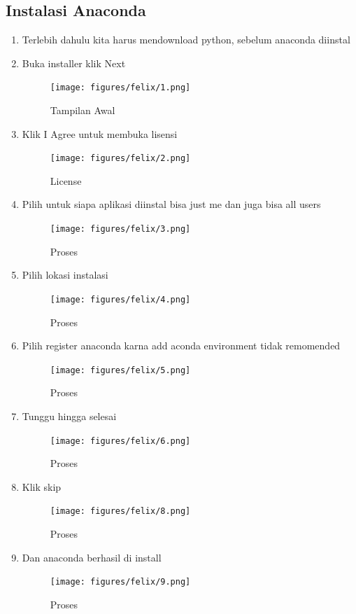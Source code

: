 \subsection{Instalasi Anaconda}
\begin{enumerate}
    \item Terlebih dahulu kita harus mendownload python, sebelum anaconda diinstal
    \item Buka installer klik Next
     \begin{figure}[!htbp]
        \centering
        \texttt{[image: figures/felix/1.png]}
        \caption{Tampilan Awal}
        \label{awal}
        \end{figure}
    \item Klik I Agree untuk membuka lisensi
     \begin{figure}[!htbp]
        \centering
        \texttt{[image: figures/felix/2.png]}
        \caption{License}
        \label{awal}
        \end{figure}
    \item  Pilih untuk siapa aplikasi diinstal bisa just me dan juga bisa all users
     \begin{figure}[!htbp]
        \centering
        \texttt{[image: figures/felix/3.png]}
        \caption{Proses}
        \label{awal}
        \end{figure}
    \item  Pilih lokasi instalasi
    \begin{figure}[!htbp]
        \centering
        \texttt{[image: figures/felix/4.png]}
        \caption{Proses}
        \label{awal}
        \end{figure}
    \item Pilih register anaconda karna add aconda environment tidak remomended
    \begin{figure}[!htbp]
        \centering
        \texttt{[image: figures/felix/5.png]}
        \caption{Proses}
        \label{awal}
        \end{figure}
    \item Tunggu hingga selesai
    \begin{figure}[!htbp]
        \centering
        \texttt{[image: figures/felix/6.png]}
        \caption{Proses}
        \label{awal}
        \end{figure}
    \item Klik skip
    \begin{figure}[!htbp]
        \centering
        \texttt{[image: figures/felix/8.png]}
        \caption{Proses}
        \label{awal}
        \end{figure}
    \item  Dan anaconda berhasil di install
    \begin{figure}[!htbp]
        \centering
        \texttt{[image: figures/felix/9.png]}
        \caption{Proses}
        \label{awal}
        \end{figure}
\end{enumerate}
